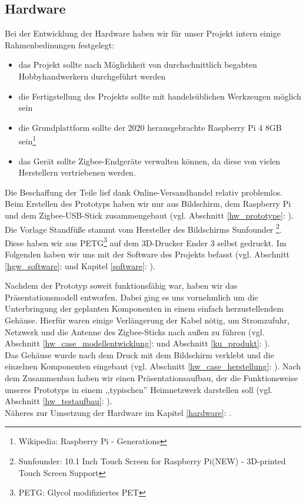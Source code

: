 \subsection{Hardware}\label{hgw_hardware}
Bei der Entwicklung der Hardware haben wir für unser Projekt intern einige Rahmenbedinungen festgelegt:
\begin{itemize}
	\item das Projekt sollte nach Möglichkeit von durchschnittlich begabten Hobbyhandwerkern durchgeführt werden
	\item die Fertigstellung des Projekts sollte mit handelsüblichen Werkzeugen möglich sein
	\item die Grundplattform sollte der 2020 herausgebrachte Raspberry Pi 4 8GB sein\footnote{Wikipedia: Raspberry Pi - Generations}
	\item das Gerät sollte Zigbee-Endgeräte
verwalten können, da diese von vielen Herstellern vertriebenen werden.
\end{itemize}
\noindent Die Beschaffung der Teile lief dank Online-Versandhandel relativ problemlos. 
Beim Erstellen des Prototyps haben wir nur aus Bildschirm, dem Raspberry Pi und dem Zigbee-USB-Stick zusammengebaut (vgl. Abschnitt \ref{hw_prototype}: ). 
Die Vorlage  Standfüße stammt vom Hersteller des Bildschirms Sunfounder \footnote{Sunfounder: 10.1 Inch Touch Screen for Raspberry Pi(NEW) - 3D-printed Touch Screen Support}.
Diese haben wir aus PETG\footnote{PETG: Glycol modifiziertes PET} auf dem 3D-Drucker Ender 3  selbst gedruckt. 
Im Folgenden haben wir uns mit der Software des Projekts befasst (vgl. Abschnitt \ref{hgw_software}:  und Kapitel \ref{software}: ).\par
\noindent Nachdem der Prototyp soweit funktionsfähig war, haben wir das Präsentationsmodell entworfen. 
Dabei ging es uns vornehmlich um die Unterbringung der geplanten Komponenten in einem einfach herzustellendem Gehäuse. 
Hierfür waren einige Verlängerung der Kabel nötig, um Stromzufuhr, Netzwerk und die Antenne des Zigbee-Sticks nach außen zu führen (vgl. Abschnitt \ref{hw_case_modellentwicklung}:  und Abschnitt \ref{ku_produkt}: ). \\
\noindent Das Gehäuse wurde nach dem Druck mit dem Bildschirm verklebt und die einzelnen Komponenten eingebaut (vgl. Abschnitt \ref{hw_case_herstellung}: ). 
Nach dem Zusammenbau haben wir einen Präsentationsaufbau, der die Funktionsweise unseres Prototyps in einem ,,typischen'' Heimnetzwerk darstellen soll (vgl. Abschnitt \ref{hw_testaufbau}: ).\\
\noindent Näheres zur Umsetzung der Hardware im Kapitel \ref{hardware}: .